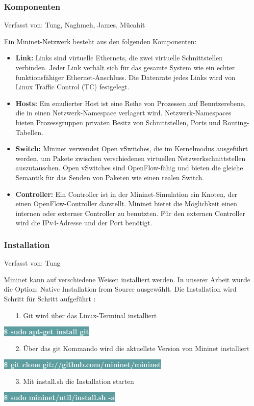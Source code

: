 \documentclass[fontsize=12pt,paper=a4,open=any,parskip=half,
  twoside=false,toc=listof,toc=bibliography,fleqn,leqno,
  captions=nooneline,captions=tableabove,british]{scrbook}
\begin{document}
\subsubsection{Komponenten}
{\tiny Verfasst von: Tung, Naghmeh, James, Mücahit\par}
Ein Mininet-Netzwerk besteht aus den folgenden Komponenten:
\begin{itemize}
 \item \textbf{Link:} Links sind virtuelle Ethernets, die zwei virtuelle Schnittstellen verbinden. Jeder Link verhält sich für das gesamte System wie ein echter funktionsfähiger Ethernet-Anschluss. Die Datenrate jedes Links wird von Linux Traffic Control (TC) festgelegt.
 \item \textbf{Hosts:} Ein emulierter Host ist eine Reihe von Prozessen auf Benutzerebene, die in einen Netzwerk-Namespace verlagert wird. Netzwerk-Namespaces bieten Prozessgruppen privaten Besitz von Schnittstellen, Ports und Routing-Tabellen.
 \item \textbf{Switch:} Mininet verwendet Open vSwitches, die im Kernelmodus ausgeführt werden, um Pakete zwischen verschiedenen virtuellen Netzwerkschnittstellen auszutauschen. Open vSwitches sind OpenFlow-fähig und bieten die gleiche Semantik für das Senden von Paketen wie einen realen Switch.
 \item \textbf{Controller:} Ein Controller ist in der Mininet-Simulation ein Knoten, der einen OpenFlow-Controller darstellt. Mininet bietet die Möglichkeit einen internen oder externer Controller zu benutzten. Für den externen Controller wird die IPv4-Adresse und der Port benötigt.
\end{itemize}


\subsubsection{Installation}
{\tiny Verfasst von: Tung\par}
Mininet kann auf verschiedene Weisen installiert werden. In unserer Arbeit wurde die Option: Native Installation from Source ausgewählt. Die Installation wird Schritt für Schritt aufgeführt \cite{mnapi}:
\begin{itemize}
\item[1.] Git wird über das Linux-Terminal installiert
\end{itemize}
\colorbox{CadetBlue}{\textcolor{white}{\textbf{\textsf{\$ sudo apt-get install git}}}}
\begin{itemize}
\item[2.] Über das git Kommando wird die aktuellste Version von Mininet installiert
\end{itemize}
\colorbox{CadetBlue}{\textcolor{white}{\textbf{\textsf{\$ git clone git://github.com/mininet/mininet}}}}
\begin{itemize}
\item[3.] Mit install.sh die Installation starten
\end{itemize}
\colorbox{CadetBlue}{\textcolor{white}{\textbf{\textsf{\$ sudo mininet/util/install.sh -a}}}}
\end{document}
